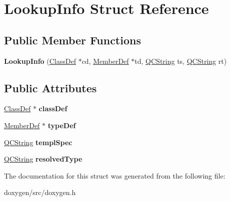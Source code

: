 \hypertarget{struct_lookup_info}{}\section{Lookup\+Info Struct Reference}
\label{struct_lookup_info}
\subsection*{Public Member Functions}
\begin{DoxyCompactItemize}
\item 
\mbox{\label{struct_lookup_info_ad8c8472ab08313b27106fe293803dca7}} 
{\bfseries Lookup\+Info} (\mbox{\hyperlink{class_class_def}{Class\+Def}} $\ast$cd, \mbox{\hyperlink{class_member_def}{Member\+Def}} $\ast$td, \mbox{\hyperlink{class_q_c_string}{Q\+C\+String}} ts, \mbox{\hyperlink{class_q_c_string}{Q\+C\+String}} rt)
\end{DoxyCompactItemize}
\subsection*{Public Attributes}
\begin{DoxyCompactItemize}
\item 
\mbox{\label{struct_lookup_info_ab45ec9bb9bd250c808f84055cfb1b523}} 
\mbox{\hyperlink{class_class_def}{Class\+Def}} $\ast$ {\bfseries class\+Def}
\item 
\mbox{\label{struct_lookup_info_a4d3180e6758e0a88e96f6ec5f80c07ec}} 
\mbox{\hyperlink{class_member_def}{Member\+Def}} $\ast$ {\bfseries type\+Def}
\item 
\mbox{\label{struct_lookup_info_ab6109313beafe89f7d42431f8da344fb}} 
\mbox{\hyperlink{class_q_c_string}{Q\+C\+String}} {\bfseries templ\+Spec}
\item 
\mbox{\label{struct_lookup_info_a55af5dfe2282dcc19615ac1e0ace76ff}} 
\mbox{\hyperlink{class_q_c_string}{Q\+C\+String}} {\bfseries resolved\+Type}
\end{DoxyCompactItemize}


The documentation for this struct was generated from the following file\+:\begin{DoxyCompactItemize}
\item 
doxygen/src/doxygen.\+h\end{DoxyCompactItemize}
